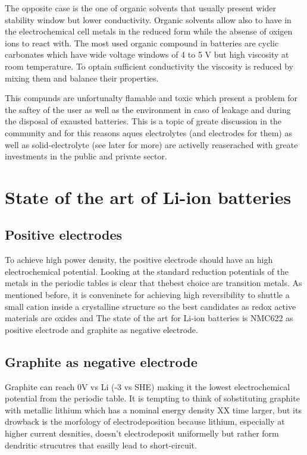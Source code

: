 The opposite case is the one of organic solvents that usually present wider stability window but lower conductivity. Organic solvents allow also to have in the electrochemical cell metals in the reduced form while the absense of oxigen ions to react with. 
The most used organic compound in batteries are cyclic carbonates which have wide voltage windows of 4 to 5 V but high viscosity at room temperature. To optain sufficient conductivity the viscosity is reduced by mixing them and balance their properties.

This compunds are unfortunalty flamable and toxic which present a problem for the saftey of the user as well as the environment in caso of leakage and during the disposal of exausted batteries. This is a topic of greate discussion in the community and for this reasons aques electrolytes (and electrodes for them) as well as solid-electrolyte (see later for more) are activelly reaserached with greate investments in the public and private sector.

\section{State of the art of Li-ion batteries}

\subsection{Positive electrodes}

To achieve high power density, the positive electrode should have an high electrochemical potential. Looking at the standard reduction potentials of the metals in the periodic tables is clear that thebest choice are transition metals. As mentioned before, it is conveninete for achieving high reversibility to shuttle a small cation inside a crystalline structure so the best candidates as redox active materials are oxides and  The state of the art for Li-ion batteries is NMC622 as positive electrode and graphite as negative electrode. 

\subsection{Graphite as negative electrode}

Graphite can reach 0V vs Li (-3 vs SHE) making it the lowest electrochemical potential from the periodic table. It is tempting  to think of sobstituting graphite with metallic lithium which has a nominal energy density XX time larger, but its drowback is the morfology of electrodeposition because lithium, especially at higher current desnities, doesn't electrodeposit uniformelly but rather form dendritic strucutres that easilly lead to short-circuit. 

